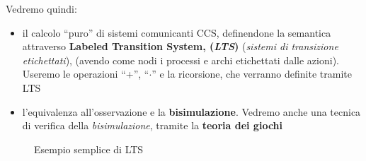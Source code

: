 \documentclass[a4paper,12pt, oneside]{book}
\begin{document}
Vedremo quindi:
\begin{itemize}
  \item il calcolo ``puro'' di sistemi comunicanti CCS, definendone la semantica
  attraverso \textbf{Labeled Transition System, (\textit{LTS})} (\textit{sistemi
    di transizione etichettati}), (avendo come nodi i processi e archi
  etichettati dalle azioni). Useremo le operazioni ``+'', ``$\cdot$'' e la
  ricorsione, che verranno definite tramite LTS
  \item l'equivalenza all'osservazione e la \textbf{bisimulazione}. Vedremo
  anche una tecnica di verifica della \textit{bisimulazione}, tramite la
  \textbf{teoria dei giochi}
\end{itemize}
\begin{figure}
  \centering
  \caption{Esempio semplice di LTS}
  \label{fig:l}
\end{figure}
\end{document}
